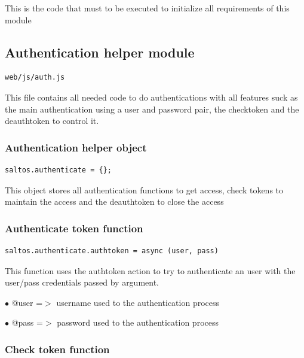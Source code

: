 \documentclass[a4paper]{article}
\begin{document}
This is the code that must to be executed to initialize all requirements of this module

\hypertarget{toc23}{}
\subsection{Authentication helper module}

\begin{lstlisting}
web/js/auth.js
\end{lstlisting}

This file contains all needed code to do authentications with all features suck as the
main authentication using a user and password pair, the checktoken and the deauthtoken
to control it.

\hypertarget{toc24}{}
\subsubsection{Authentication helper object}

\begin{lstlisting}
saltos.authenticate = {};
\end{lstlisting}

This object stores all authentication functions to get access, check tokens to maintain
the access and the deauthtoken to close the access

\hypertarget{toc25}{}
\subsubsection{Authenticate token function}

\begin{lstlisting}
saltos.authenticate.authtoken = async (user, pass)
\end{lstlisting}

This function uses the authtoken action to try to authenticate an user with the user/pass
credentials passed by argument.

\begin{compactitem}
\item[\color{myblue}$\bullet$] @user =$>$ username used to the authentication process
\item[\color{myblue}$\bullet$] @pass =$>$ password used to the authentication process
\end{compactitem}

\hypertarget{toc26}{}
\subsubsection{Check token function}
\end{document}
